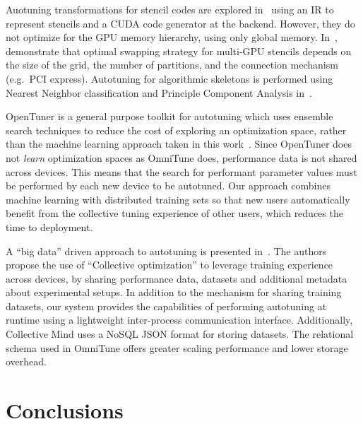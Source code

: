 \documentclass[nonatbib,preprint,nocopyrightspace,9pt]{sigplanconf}
\begin{document}
  Auotuning transformations for stencil codes are explored in~\cite{Kamil2010}
  using an IR to represent stencils and a CUDA code generator at the backend.
  However, they do not optimize for the GPU memory hierarchy, using only global
  memory. In~\cite{Lutz2013}, \citeauthor{Lutz2013} demonstrate that optimal
  swapping strategy for multi-GPU stencils depends on the size of the grid, the
  number of partitions, and the connection mechanism (e.g.\ PCI express).
  Autotuning for algorithmic skeletons is performed using Nearest Neighbor
  classification and Principle Component Analysis in~\cite{Collins2013}.

  OpenTuner is a general purpose toolkit for autotuning which uses ensemble search
  techniques to reduce the cost of exploring an optimization space, rather than
  the machine learning approach taken in this work~\cite{Ansel2013}. Since
  OpenTuner does not \emph{learn} optimization spaces as OmniTune does,
  performance data is not shared across devices. This means that the search for
  performant parameter values must be performed by each new device to be
  autotuned. Our approach combines machine learning with distributed training sets
  so that new users automatically benefit from the collective tuning experience of
  other users, which reduces the time to deployment.

  A ``big data'' driven approach to autotuning is presented in~\cite{Fursin2014}.
  The authors propose the use of ``Collective optimization'' to leverage training
  experience across devices, by sharing performance data, datasets and additional
  metadata about experimental setups. In addition to the mechanism for sharing
  training datasets, our system provides the capabilities of performing autotuning
  at runtime using a lightweight inter-process communication interface.
  Additionally, Collective Mind uses a NoSQL JSON format for storing datasets. The
  relational schema used in OmniTune offers greater scaling performance and lower
  storage overhead.


  \section{Conclusions}\label{sec:conclusions}
\end{document}
